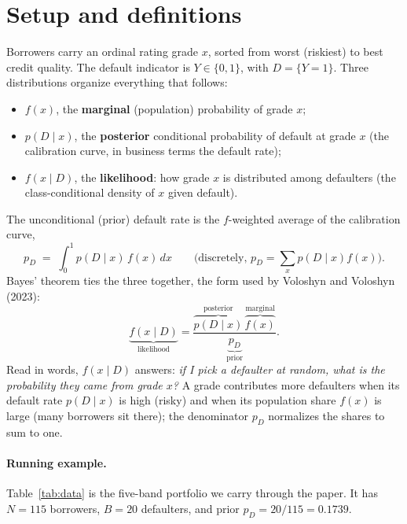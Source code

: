 \documentclass[12pt]{article}
\newcommand{\pD}{p_D}
\newcommand{\PDx}{p(D \mid x)}
\begin{document}
\section{Setup and definitions}\label{sec:setup}

Borrowers carry an ordinal rating grade $x$, sorted from worst (riskiest) to best credit quality. The
default indicator is $Y\in\{0,1\}$, with $D=\{Y=1\}$. Three distributions organize
everything that follows:
\begin{itemize}
\item $f(x)$, the \textbf{marginal} (population) probability of grade $x$;
\item $\PDx$, the \textbf{posterior} conditional probability of default at grade $x$
(the calibration curve, in business terms the default rate);
\item $f(x\mid D)$, the \textbf{likelihood}: how grade $x$ is distributed among defaulters
(the class-conditional density of $x$ given default).
\end{itemize}
The unconditional (prior) default rate is the $f$-weighted average of the calibration curve,
\begin{equation}\label{eq:prior}
\pD \;=\; \int_0^1 \PDx\,f(x)\,dx
\qquad\text{(discretely, }\textstyle\pD=\sum_x \PDx f(x)\text{)}.
\end{equation}
Bayes' theorem ties the three together, the form used by Voloshyn and Voloshyn (2023):
\begin{equation}\label{eq:bayes}
\underbrace{f(x\mid D)}_{\text{likelihood}}
=\frac{\overbrace{\PDx}^{\text{posterior}}\,\overbrace{f(x)}^{\text{marginal}}}
{\underbrace{\pD}_{\text{prior}}}.
\end{equation}
Read in words, $f(x\mid D)$ answers: \emph{if I pick a defaulter at random, what is the
probability they came from grade $x$?} A grade contributes more defaulters when its default rate
$\PDx$ is high (risky) and when its population share $f(x)$ is large (many borrowers
sit there); the denominator $\pD$ normalizes the shares to sum to one.

\paragraph{Running example.} Table~\ref{tab:data} is the five-band portfolio we carry through
the paper. It has $N=115$ borrowers, $B=20$ defaulters, and prior $\pD = 20/115 = 0.1739$.
\end{document}
